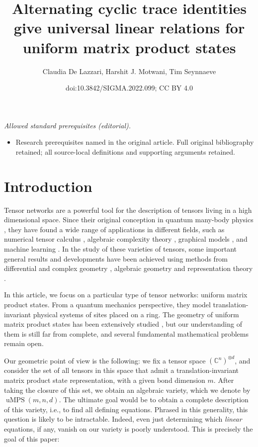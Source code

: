 \documentclass[10pt,a4paper]{amsart}
\title{Alternating cyclic trace identities give universal linear relations for uniform matrix product states}
\author{Claudia De Lazzari, Harshit J. Motwani, Tim Seynnaeve}
\date{doi:10.3842/SIGMA.2022.099; CC BY 4.0}
\numberwithin{equation}{section}
\newcommand{\CC}{\mathbb{C}}
\newcommand{\ot}{\otimes}
\DeclareMathOperator{\uMPS}{uMPS}
\begin{document}
\maketitle
\noindent\textit{Allowed standard prerequisites (editorial).}\begin{itemize}
\item Research prerequisites named in the original article. Full original bibliography retained; all source-local definitions and supporting arguments retained.
\end{itemize}\medskip
\section{Introduction}

Tensor networks are a powerful tool for the description of tensors living in a high dimensional space. Since their original conception in quantum many-body physics  \cite{AffKenLieTas:ValenceBondGroundStates,fannes1992finitely,OstRom:ThermoLimitDensityMatrixRenorm}, they have found a wide range of applications in different fields, such as numerical tensor calculus \cite{bachmayr2016tensor,cichocki2016tensor,hackbuschTensorSpaces, oseledets2011tensor}, algebraic complexity theory \cite{DvMaPeYe:Multi_Branching_Programs}, %
graphical models \cite{robevaSeigal}, and machine learning \cite{chen2018equivalence, cichocki2016tensor}.
In the study of these varieties of tensors, some important general results and developments have been achieved using methods from differential and complex geometry \cite{haegeman2014geometry}, algebraic geometry and representation theory \cite{barthel2022closedness,bernardi2022dimension,BucBucMic:HackbushConjecture,ChrGesStWer:Optimization,ChrLucVraWer:TensorNetworkRepGeom,hackl2020geometry, landsbergQiYe}.

In this article, we focus on a particular type of tensor networks: uniform matrix product states. From a quantum mechanics perspective, they model translation-invariant physical systems of sites placed on a ring. The geometry of uniform matrix product states has been extensively studied \cite{Critch2014AlgebraicGO,Czaplinski2019UniformMP,haegeman2014geometry, PerezGarciaVerstraeteMPS}, but our understanding of them is still far from complete, and several fundamental mathematical problems remain open.

Our geometric point of view is the following: we fix a tensor space $(\CC^n)^{\ot d}$, and consider the set of all tensors in this space that admit a translation-invariant matrix product state representation, with a given bond dimension $m$. After taking the closure of this set, we obtain an algebraic variety, which we denote by $\uMPS(m,n,d)$.
The ultimate goal would be to obtain a complete description of this variety, i.e., to find all defining equations. Phrased in this generality, this question is likely to be intractable. Indeed, even just determining which \emph{linear} equations, if any, vanish on our variety is poorly understood. This is precisely the goal of this paper:
\end{document}
